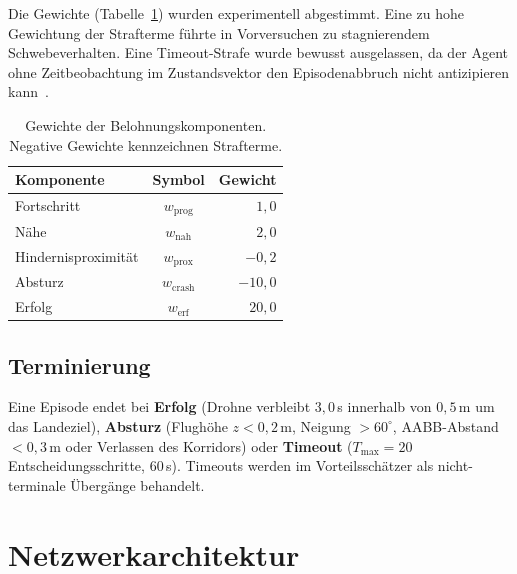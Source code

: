 \medskip
Die Gewichte (Tabelle~\ref{tab:reward_weights}) wurden experimentell
abgestimmt. Eine zu hohe Gewichtung der Strafterme führte in Vorversuchen
zu stagnierendem Schwebeverhalten. Eine Timeout-Strafe wurde bewusst
ausgelassen, da der Agent ohne Zeitbeobachtung im Zustandsvektor den
Episodenabbruch nicht antizipieren
kann~\autocite{rudinLearningWalkMinutes2022}.

\begin{table}[ht]
  \centering
  \caption[Gewichte der Belohnungskomponenten]{Gewichte der Belohnungskomponenten. Negative Gewichte kennzeichnen Strafterme.}
  \label{tab:reward_weights}
  \begin{tabular}{l c r}
    \toprule
    Komponente & Symbol & Gewicht \\
    \midrule
    Fortschritt          & $w_{\mathrm{prog}}$  & $1{,}0$   \\
    Nähe                 & $w_{\mathrm{nah}}$   & $2{,}0$   \\
    Hindernisproximität  & $w_{\mathrm{prox}}$  & $-0{,}2$  \\
    Absturz              & $w_{\mathrm{crash}}$ & $-10{,}0$ \\
    Erfolg               & $w_{\mathrm{erf}}$   & $20{,}0$  \\
    \bottomrule
  \end{tabular}
\end{table}

\subsection{Terminierung}
\label{subsec:meth_terminierung}

Eine Episode endet bei \textbf{Erfolg} (Drohne verbleibt $3{,}0$\,s
innerhalb von $0{,}5$\,m um das Landeziel), \textbf{Absturz} (Flughöhe
$z < 0{,}2$\,m, Neigung $> 60^{\circ}$, AABB-Abstand $< 0{,}3$\,m oder
Verlassen des Korridors) oder \textbf{Timeout} ($T_{\max} = 20$
Entscheidungsschritte, $60$\,s). Timeouts werden im Vorteilsschätzer als
nicht-terminale Übergänge behandelt.

\section{Netzwerkarchitektur}
\label{sec:meth_architektur}

